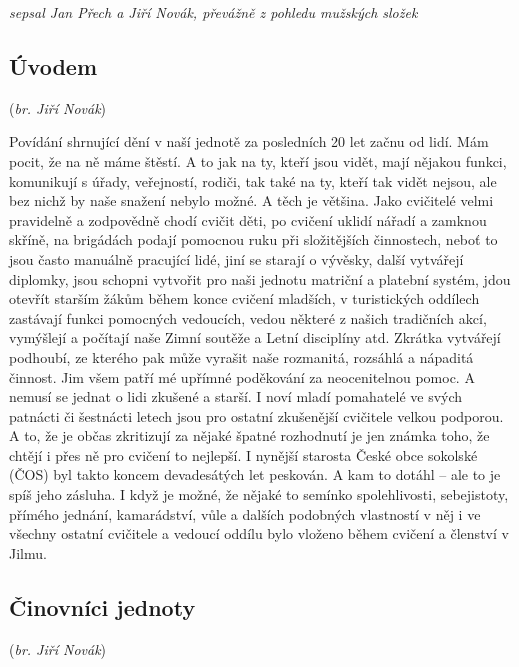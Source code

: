 \emph{sepsal Jan Přech a Jiří Novák, převážně z pohledu mužských složek}

\subsection{\texorpdfstring{Úvodem }{Úvodem }}\label{uxfavodem}

(\emph{br. Jiří Novák})

Povídání shrnující dění v naší jednotě za posledních 20 let začnu od
lidí. Mám pocit, že na ně máme štěstí. A to jak na ty, kteří jsou vidět,
mají nějakou funkci, komunikují s úřady, veřejností, rodiči, tak také na
ty, kteří tak vidět nejsou, ale bez nichž by naše snažení nebylo možné.
A těch je většina. Jako cvičitelé velmi pravidelně a zodpovědně chodí
cvičit děti, po cvičení uklidí nářadí a zamknou skříně, na brigádách
podají pomocnou ruku při složitějších činnostech, neboť to jsou často
manuálně pracující lidé, jiní se starají o vývěsky, další vytvářejí
diplomky, jsou schopni vytvořit pro naši jednotu matriční a platební
systém, jdou otevřít starším žákům během konce cvičení mladších, v
turistických oddílech zastávají funkci pomocných vedoucích, vedou
některé z našich tradičních akcí, vymýšlejí a počítají naše Zimní
soutěže a Letní disciplíny atd. Zkrátka vytvářejí podhoubí, ze kterého
pak může vyrašit naše rozmanitá, rozsáhlá a nápaditá činnost. Jim všem
patří mé upřímné poděkování za neocenitelnou pomoc. A nemusí se jednat o
lidi zkušené a starší. I noví mladí pomahatelé ve svých patnácti či
šestnácti letech jsou pro ostatní zkušenější cvičitele velkou podporou.
A to, že je občas zkritizují za nějaké špatné rozhodnutí je jen známka
toho, že chtějí i přes ně pro cvičení to nejlepší. I nynější starosta
České obce sokolské (ČOS) byl takto koncem devadesátých let peskován. A
kam to dotáhl -- ale to je spíš jeho zásluha. I když je možné, že nějaké
to semínko spolehlivosti, sebejistoty, přímého jednání, kamarádství,
vůle a dalších podobných vlastností v něj i ve všechny ostatní cvičitele
a vedoucí oddílu bylo vloženo během cvičení a členství v Jilmu.

\subsection{Činovníci jednoty}\label{ux10dinovnuxedci-jednoty}

(\emph{br. Jiří Novák})

